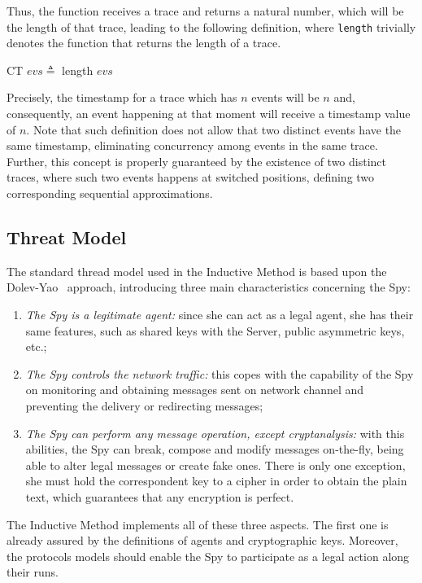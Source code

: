 Thus, the function receives a trace and returns a natural number, which will be the length of that trace, leading to the following definition, where \texttt{length} trivially denotes the function that returns the length of a trace.

\begin{center}
  {\ttfamily CT \(evs \triangleq \) length \(evs\)}
\end{center}

Precisely, the timestamp for a trace which has \(n\) events will be \(n\) and, consequently, an event happening at that moment will receive a timestamp value of \(n\). Note that such definition does not allow that two distinct events have the same timestamp, eliminating concurrency among events in the same trace. Further, this concept is properly guaranteed by the existence of two distinct traces, where such two events happens at switched positions, defining two corresponding sequential approximations.


\subsection{Threat Model}\label{ssec:threat-model}
The standard thread model used in the Inductive Method is based upon the Dolev-Yao~\cite{DolevYao81} approach, introducing three main characteristics concerning the Spy:

\begin{enumerate}
  \item \textit{The Spy is a legitimate agent:} since she can act as a legal agent, she has their same features, such as shared keys with the Server, public asymmetric keys, etc.;

  \item \textit{The Spy controls the network traffic:} this copes with the capability of the Spy on monitoring and obtaining messages sent on network channel and  preventing the delivery or redirecting messages;

  \item \textit{The Spy can perform any message operation, except cryptanalysis:} with this abilities, the Spy can break, compose and modify messages on-the-fly, being able to alter legal messages or create fake ones. There is only one exception, she must hold the correspondent key to a cipher in order to obtain the plain text, which guarantees that any encryption is perfect.
\end{enumerate}

The Inductive Method implements all of these three aspects. The first one is already assured by the definitions of agents and cryptographic keys. Moreover, the protocols models should enable the Spy to participate as a legal action along their runs.

